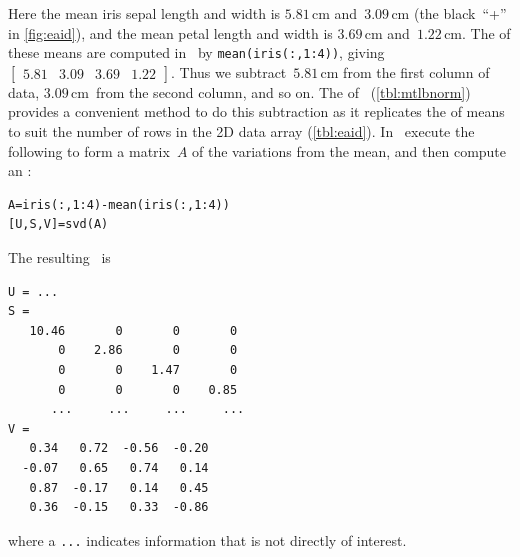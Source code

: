 \begin{example}
\begin{solution}
\begin{enumerate}
Here the mean iris sepal length and width is \(5.81\)\,cm and~\(3.09\)\,cm (the black~``+'' in \cref{fig:eaid}), and the mean petal length and width is \(3.69\)\,cm and~\(1.22\)\,cm.
The  of these means are computed in \script\ by \verb|mean(iris(:,1:4))|, giving \(\begin{bmatrix} 5.81&3.09&3.69&1.22 \end{bmatrix}\).
Thus we subtract~\(5.81\)\,cm from the first column of data, \(3.09\)\,cm~from the second column, and so on.
The  of \script\ (\cref{tbl:mtlbnorm}) provides a convenient method to do this subtraction as it replicates the  of means to suit the number of rows in the 2D data array (\cref{tbl:eaid}).
In \script\ execute the following to form a matrix~\(A\) of the variations from the mean, and then compute an \svd:%
\begin{verbatim}
A=iris(:,1:4)-mean(iris(:,1:4))
[U,S,V]=svd(A)
\end{verbatim}
\setbox\ajrqrbox\hbox{}%
\marginajrbox%
The resulting \svd\ is \twodp
\begin{verbatim}
U = ...
S =
   10.46       0       0       0
       0    2.86       0       0
       0       0    1.47       0
       0       0       0    0.85
      ...     ...     ...     ...
V =
   0.34   0.72  -0.56  -0.20
  -0.07   0.65   0.74   0.14
   0.87  -0.17   0.14   0.45
   0.36  -0.15   0.33  -0.86
\end{verbatim}
where a \verb|...| indicates information that is not directly of interest.


\end{enumerate}
\end{solution}
\end{example}
